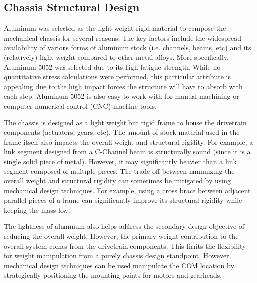 
\subsection{Chassis Structural Design} %
\label{sub:structural_design}
Aluminum was selected as the light weight rigid material to compose the mechanical chassis for several reasons. The key factors include the widespread availability of various forms of aluminum stock (i.e. channels, beams, etc) and its (relatively) light weight compared to other metal alloys. More specifically, Aluminum 5052 was selected due to its high fatigue strength. While no quantitative stress calculations were performed, this particular attribute is appealing due to the high impact forces the structure will have to absorb with each step. Aluminum 5052 is also easy to work with for manual machining or computer numerical control (CNC) machine tools. 

The chassis is designed as a light weight but rigid frame to house the drivetrain components (actuators, gears, etc). The amount of stock material used in the frame itself also impacts the overall weight and structural rigidity. For example, a link segment designed from a C-Channel beam is structurally sound (since it is a single solid piece of metal). However, it may significantly heavier than a link segment composed of multiple pieces. The trade off between minimizing the overall weight and structural rigidity can sometimes be mitigated by using mechanical design techniques. For example, using a cross brace between adjacent parallel pieces of a frame can significantly improve its structural rigidity while keeping the mass low.  

The lightness of aluminum also helps address the secondary design objective of reducing the overall weight. However, the primary weight contribution to the overall system comes from the drivetrain components. This limits the flexibility for weight manipulation from a purely chassis design standpoint. However, mechanical design techniques can be used manipulate the COM location by strategically positioning the mounting points for motors and gearheads. 

